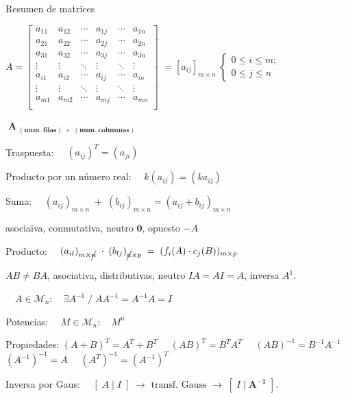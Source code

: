 \begin{myalertblock}{Resumen de matrices}

$A=\left[
\begin{matrix}
a_{11} & a_{12} & \cdots & a_{1j} & \cdots & a_{1n} \\
a_{21} & a_{22} & \cdots & a_{2j} & \cdots & a_{2n} \\
a_{31} & a_{32} & \cdots & a_{3j} & \cdots & a_{3n} \\
\vdots & \vdots & \ddots & \vdots & \ddots & \vdots \\
a_{i1} & a_{i2} & \cdots & \boxed{a_{ij}} & \cdots & a_{in} \\
\vdots & \vdots & \ddots & \vdots & \ddots & \vdots \\
a_{m1} & a_{m2} & \cdots & a_{mj} & \cdots & a_{mn} \\
\end{matrix}
\right]$
\footnotesize{$= [a_{ij}]_{m \times n} \; \begin{cases}0\le i \le m; \\ 0\le j \le n\end{cases}$}

\vspace{3mm}
\centerline{$\boxed{\; \boldsymbol{A_{\;  (num. \; filas)\; \times \; (num. \; columnas) }}\; }$}

\vspace{2mm} Traspuesta: $\quad (a_{ij})^T=(a_{ji})$

\vspace{2mm} Producto por un número real: $\quad k(a_{ij})=(ka_{ij})$

\vspace{2mm} Suma: $\quad (a_{ij})_{m \times n}\; + \; (b_{ij})_{m \times n}=(a_{ij}+b_{ij})_{m \times n}$

\hspace{12mm} asociaiva, conmutativa, neutro $\boldsymbol{0}$, opuesto $-A$

\vspace{2mm} Producto: $\quad (a_{il})_{m \times \cancel{n}} \; \cdot \;(b_{lj})_{\cancel{n} \times p} \; = \; (f_i(A)\cdot c_j(B))_{m \times p}$

\hspace{15mm} \scriptsize{$AB \neq BA$, asociativa, distributivas, neutro $IA=AI=A$, inversa $A^{1}$}\footnotesize{.}

\hspace{12mm} $\quad A \in \mathcal M_n: \quad \exists A^{-1}\; / \; AA^{-1}=A^{-1}A=I$

\vspace{2mm} Potencias:  $\quad M\in \mathcal M_n :\quad M^n$

\vspace{2mm} Propiedades: $(A+B)^T=A^T+B^T \quad $ $(AB)^T=B^TA^T \quad $ $(AB)^{-1}=B^{-1}A^{-1} \quad $ $(A^{-1})^{-1}=A \quad $ $(A^T)^{-1}=(A^{-1})^T$

\vspace{2mm} Inversa por Gaus: $ \quad [\; A \; | \; I \; ] \; \to \text{ transf. Gauss } \to  \; [\; I \; | \; \boldsymbol{ A^{-1} } \; ] $\normalsize{.}

\end{myalertblock}


